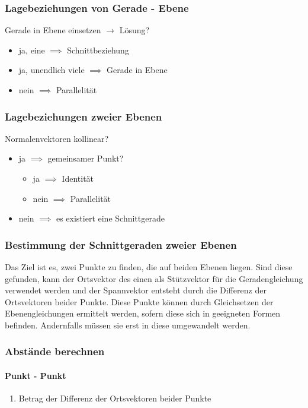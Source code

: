 \documentclass{article}
\begin{document}
  \subsubsection{Lagebeziehungen von Gerade - Ebene}
  Gerade in Ebene einsetzen $\rightarrow$ Lösung?
  \begin{itemize}
  	\item ja, eine $\implies$ Schnittbeziehung
  	\item ja, unendlich viele $\implies$ Gerade in Ebene
  	\item nein $\implies$ Parallelität
  \end{itemize}
  
  \subsubsection{Lagebeziehungen zweier Ebenen}
  Normalenvektoren kollinear?
  \begin{itemize}
  	\item ja $\implies$ gemeinsamer Punkt? \\
  	\begin{itemize}
  		\item ja $\implies$ Identität 
  		\item nein $\implies$ Parallelität
  	\end{itemize}
  	\item nein $\implies$ es existiert eine Schnittgerade
  \end{itemize}
  
  \subsubsection{Bestimmung der Schnittgeraden zweier Ebenen}
  Das Ziel ist es, zwei Punkte zu finden, die auf beiden Ebenen liegen. Sind diese gefunden, kann der Ortsvektor des einen als Stützvektor für die Geradengleichung verwendet werden und der Spannvektor entsteht durch die Differenz der Ortsvektoren beider Punkte. Diese Punkte können durch Gleichsetzen der Ebenengleichungen ermittelt werden, sofern diese sich in geeigneten Formen befinden. Andernfalls müssen sie erst in diese umgewandelt werden. 
  
  \subsubsection{Abstände berechnen}
  
  \paragraph{Punkt - Punkt}
  \begin{enumerate}
  	\item Betrag der Differenz der Ortsvektoren beider Punkte
  \end{enumerate}
  
\end{document}
